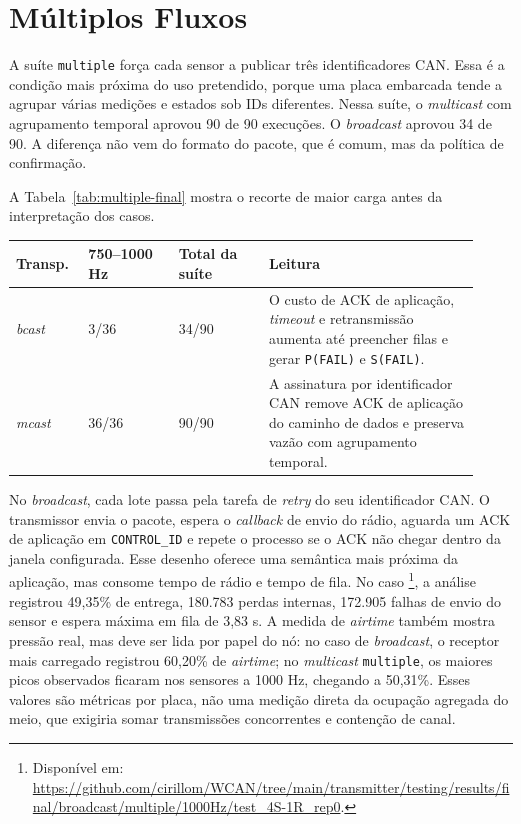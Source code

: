 \section{Múltiplos Fluxos}

A suíte \texttt{multiple} força cada sensor a publicar três identificadores CAN. Essa é a
condição mais próxima do uso pretendido, porque uma placa embarcada tende a
agrupar várias medições e estados sob IDs diferentes. Nessa suíte, o \emph{multicast}
com agrupamento temporal aprovou 90 de 90 execuções. O \emph{broadcast} aprovou 34 de 90.
A diferença não vem do formato do pacote, que é comum, mas da política de
confirmação.

A Tabela~\ref{tab:multiple-final} mostra o recorte de maior carga antes da
interpretação dos casos.

\begin{center}
\small
\setlength{\tabcolsep}{5pt}
\renewcommand{\arraystretch}{1.12}
\begin{tabular}{p{0.14\linewidth}|p{0.18\linewidth}|p{0.18\linewidth}|p{0.42\linewidth}}
\hline
Transp. & 750--1000 Hz & Total da suíte & Leitura \\
\hline
\emph{bcast} & 3/36 & 34/90 & O custo de ACK de aplicação, \emph{timeout} e retransmissão aumenta até preencher filas e gerar \texttt{P(FAIL)} e \texttt{S(FAIL)}. \\
\hline
\emph{mcast} & 36/36 & 90/90 & A assinatura por identificador CAN remove ACK de aplicação do caminho de dados e preserva vazão com agrupamento temporal. \\
\hline
\end{tabular}
\label{tab:multiple-final}
\end{center}

No \emph{broadcast}, cada lote passa pela tarefa de \emph{retry} do seu identificador CAN. O transmissor
envia o pacote, espera o \emph{callback} de envio do rádio, aguarda um ACK de aplicação
em \texttt{CONTROL\_ID} e repete o processo se o ACK não chegar dentro da janela
configurada. Esse desenho oferece uma semântica mais próxima da aplicação, mas
consome tempo de rádio e tempo de fila. No caso
\footnote{Disponível em: \url{https://github.com/cirillom/WCAN/tree/main/transmitter/testing/results/final/broadcast/multiple/1000Hz/test_4S-1R_rep0}.}, a análise registrou 49,35\%
de entrega, 180.783 perdas internas, 172.905 falhas de envio do sensor e espera
máxima em fila de 3,83 s. A medida de \emph{airtime} também mostra pressão real,
mas deve ser lida por papel do nó: no caso de \emph{broadcast}, o receptor mais
carregado registrou 60,20\% de \emph{airtime}; no \emph{multicast} \texttt{multiple},
os maiores picos observados ficaram nos sensores a 1000 Hz, chegando a 50,31\%.
Esses valores são métricas por placa, não uma medição direta da ocupação agregada
do meio, que exigiria somar transmissões concorrentes e contenção de canal.

